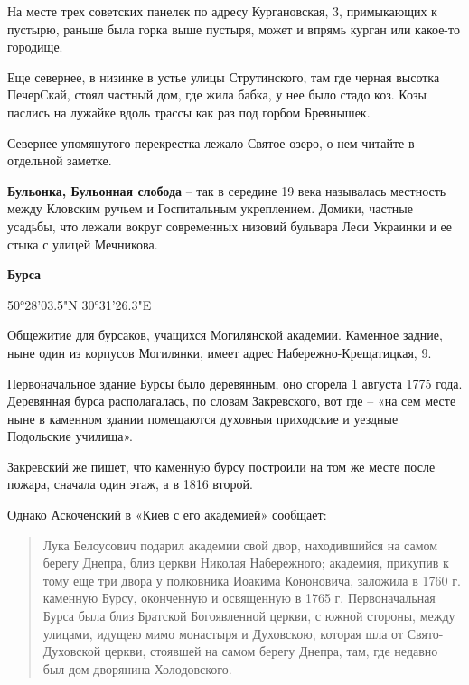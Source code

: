 На месте трех советских панелек по адресу Кургановская, 3, примыкающих к пустырю, раньше была горка выше пустыря, может и впрямь курган или какое-то городище.

Еще севернее, в низинке в устье улицы Струтинского, там где черная высотка ПечерСкай, стоял частный дом, где жила бабка, у нее было стадо коз. Козы паслись на лужайке вдоль трассы как раз под горбом Бревнышек.

Севернее упомянутого перекрестка лежало Святое озеро, о нем читайте в отдельной заметке.\\

\medskip

\textbf{Бульонка, Бульонная слобода} – так в середине 19 века называлась местность между Кловским ручьем и Госпитальным укреплением. Домики, частные усадьбы, что лежали вокруг современных низовий бульвара Леси Украинки и ее стыка с улицей Мечникова.\\

\medskip

\textbf{Бурса} 

50°28'03.5"N 30°31'26.3"E

Общежитие для бурсаков, учащихся Могилянской академии. Каменное задние, ныне один из корпусов Могилянки, имеет адрес Набережно-Крещатицкая, 9. 

Первоначальное здание Бурсы было деревянным, оно сгорела 1 августа 1775 года. Деревянная бурса располагалась, по словам Закревского, вот где – «на сем месте ныне в каменном здании помещаются духовныя приходские и уездные Подольские училища». 

Закревский же пишет, что каменную бурсу построили на том же месте после пожара, сначала один этаж, а в 1816 второй.

Однако Аскоченский в «Киев с его академией» сообщает:

\begin{quotation}
Лука Белоусович подарил академии свой двор, находившийся на самом берегу Днепра, близ церкви Николая Набережного; академия, прикупив к тому еще три двора у полковника Иоакима Кононовича, заложила в 1760 г. каменную Бурсу, оконченную и освященную в 1765 г. Первоначальная Бурса была близ Братской Богоявленной церкви, с южной стороны, между улицами, идущею мимо монастыря и Духовскою, которая шла от Свято-Духовской церкви, стоявшей на самом берегу Днепра, там, где недавно был дом дворянина Холодовского.
\end{quotation}

\medskip

